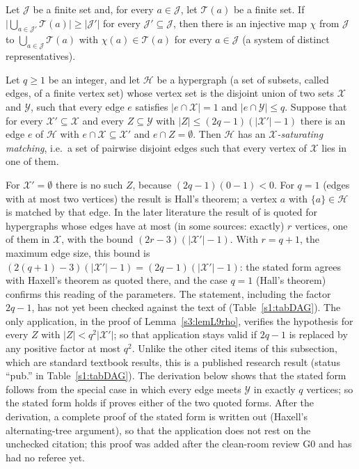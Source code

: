\begin{citedresult}\label{s1:citHall}
Let $\mathcal J$ be a finite set and, for every $a\in\mathcal J$, let
$\mathcal T(a)$ be a finite set. If
$\bigl|\bigcup_{a\in\mathcal J'}\mathcal T(a)\bigr|\ge|\mathcal J'|$ for every
$\mathcal J'\subseteq\mathcal J$, then there is an injective map $\chi$ from
$\mathcal J$ to $\bigcup_{a\in\mathcal J}\mathcal T(a)$ with
$\chi(a)\in\mathcal T(a)$ for every $a\in\mathcal J$ (a system of distinct
representatives).
\end{citedresult}

\begin{citedresult}\label{s1:citHaxell}
Let $q\ge1$ be an integer, and let $\mathcal H$ be a hypergraph (a set of
subsets, called edges, of a finite vertex set) whose vertex set is the
disjoint union of two sets $\mathcal X$ and $\mathcal Y$, such that every edge
$e$ satisfies $|e\cap\mathcal X|=1$ and $|e\cap\mathcal Y|\le q$. Suppose that
for every $\mathcal X'\subseteq\mathcal X$ and every $Z\subseteq\mathcal Y$ with
$|Z|\le(2q-1)(|\mathcal X'|-1)$ there is an edge $e$ of $\mathcal H$ with
$e\cap\mathcal X\subseteq\mathcal X'$ and $e\cap Z=\emptyset$. Then
$\mathcal H$ has an \emph{$\mathcal X$-saturating matching}, i.e.\ a set of
pairwise disjoint edges such that every vertex of $\mathcal X$ lies in one of
them.

For $\mathcal X'=\emptyset$ there is no such $Z$, because $(2q-1)(0-1)<0$. For
$q=1$ (edges with at most two vertices) the result is Hall's theorem; a vertex
$a$ with $\{a\}\in\mathcal H$ is matched by that edge. In the later literature
the result of \cite{Hax95} is quoted for hypergraphs whose edges have at most
(in some sources: exactly) $r$ vertices, one of them in $\mathcal X$, with the
bound $(2r-3)(|\mathcal X'|-1)$. With $r=q+1$, the maximum edge size, this bound
is $(2(q+1)-3)(|\mathcal X'|-1)=(2q-1)(|\mathcal X'|-1)$: the stated form agrees
with Haxell's theorem as quoted there, and the case $q=1$ (Hall's theorem)
confirms this reading of the parameters. The statement, including the factor
$2q-1$, has not yet been checked against the text of \cite{Hax95}
(Table~\ref{s1:tabDAG}). The only application, in the proof of
Lemma~\ref{s3:lemL9rho}, verifies the hypothesis for every $Z$ with
$|Z|<q^2|\mathcal X'|$; so that application stays valid if $2q-1$ is replaced
by any positive factor at most $q^2$. Unlike the other cited items of this
subsection, which are standard textbook results, this is a published research
result (status ``pub.'' in Table~\ref{s1:tabDAG}). The derivation below shows
that the stated form follows from the special case in which every edge meets
$\mathcal Y$ in exactly $q$ vertices; so the stated form holds if \cite{Hax95}
proves either of the two quoted forms. After the derivation, a complete proof of
the stated form is written out (Haxell's alternating-tree argument), so that
the application does not rest on the unchecked citation; this proof was added
after the clean-room review G0 and has had no referee yet.
\end{citedresult}
